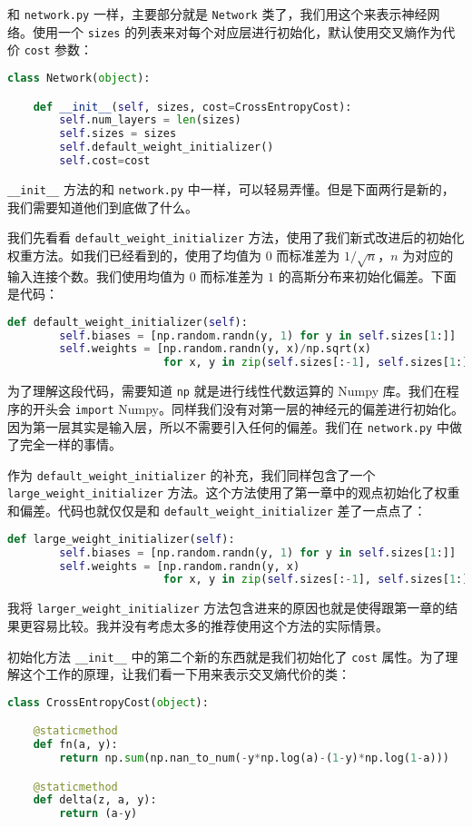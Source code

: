 和 \lstinline!network.py! 一样，主要部分就是 \lstinline!Network! 类了，我们用这个来表示神经网络。使用一个 \lstinline!sizes! 的列表来对每个对应层进行初始化，默认使用交叉熵作为代价 \lstinline!cost! 参数：
\begin{lstlisting}[language=Python]
class Network(object):

    def __init__(self, sizes, cost=CrossEntropyCost):
        self.num_layers = len(sizes)
        self.sizes = sizes
        self.default_weight_initializer()
        self.cost=cost
\end{lstlisting}

\lstinline!__init__! 方法的和 \lstinline!network.py! 中一样，可以轻易弄懂。但是下面两行是新的，我们需要知道他们到底做了什么。

我们先看看 \lstinline!default_weight_initializer! 方法，使用了我们新式改进后的初始化权重方法。如我们已经看到的，使用了均值为 $0$ 而标准差为 $1/\sqrt{n}$，$n$ 为对应的输入连接个数。我们使用均值为 $0$ 而标准差为 $1$ 的高斯分布来初始化偏差。下面是代码：
\begin{lstlisting}[language=Python]
def default_weight_initializer(self):
        self.biases = [np.random.randn(y, 1) for y in self.sizes[1:]]
        self.weights = [np.random.randn(y, x)/np.sqrt(x) 
                        for x, y in zip(self.sizes[:-1], self.sizes[1:])]
\end{lstlisting}

为了理解这段代码，需要知道 \lstinline!np! 就是进行线性代数运算的 Numpy 库。我们在程序的开头会 \lstinline!import! Numpy。同样我们没有对第一层的神经元的偏差进行初始化。因为第一层其实是输入层，所以不需要引入任何的偏差。我们在 \lstinline!network.py! 中做了完全一样的事情。

作为 \lstinline!default_weight_initializer! 的补充，我们同样包含了一个 \lstinline!large_weight_initializer! 方法。这个方法使用了第一章中的观点初始化了权重和偏差。代码也就仅仅是和 \lstinline!default_weight_initializer! 差了一点点了：
\begin{lstlisting}[language=Python]
def large_weight_initializer(self):
        self.biases = [np.random.randn(y, 1) for y in self.sizes[1:]]
        self.weights = [np.random.randn(y, x) 
                        for x, y in zip(self.sizes[:-1], self.sizes[1:])]
\end{lstlisting}

我将 \lstinline!larger_weight_initializer! 方法包含进来的原因也就是使得跟第一章的结果更容易比较。我并没有考虑太多的推荐使用这个方法的实际情景。

初始化方法 \lstinline!__init__! 中的第二个新的东西就是我们初始化了 \lstinline!cost! 属性。为了理解这个工作的原理，让我们看一下用来表示交叉熵代价的类：
\begin{lstlisting}[language=Python]
class CrossEntropyCost(object):

    @staticmethod
    def fn(a, y):
        return np.sum(np.nan_to_num(-y*np.log(a)-(1-y)*np.log(1-a)))

    @staticmethod
    def delta(z, a, y):
        return (a-y)
\end{lstlisting}

